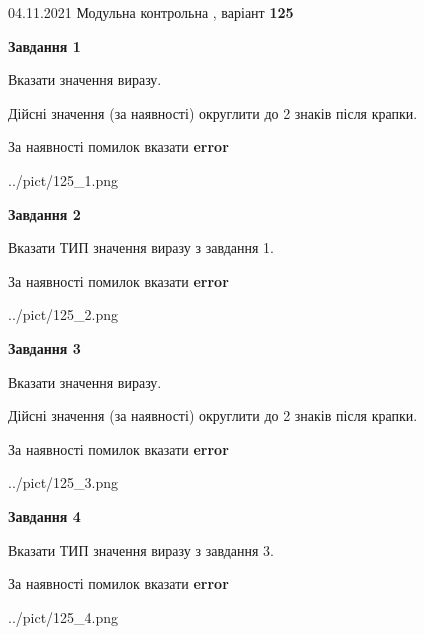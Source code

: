\documentclass[11pt, ukrainian]{article}
\begin{document}
{04.11.2021 Модульна контрольна , варіант  \No \textbf { 125 }\par}
{
\begin {large}
{\begin {center}\textbf{Завдання 1}\end {center}}\par
Вказати значення виразу. \par
Дійсні значення (за наявності) округлити до 2 знаків після крапки. \par
За наявності помилок вказати \textbf{error}

\begin{center}
	{../pict/125_1.png}
\end{center}
\newpage

{\begin {center}\textbf{Завдання 2}\end {center}}\par
Вказати ТИП значення виразу з завдання 1. \par
За наявності помилок вказати \textbf{error}

\begin{center}
	{../pict/125_2.png}
\end{center}
\newpage

{\begin {center}\textbf{Завдання 3}\end {center}}\par
Вказати значення виразу. \par
Дійсні значення (за наявності) округлити до 2 знаків після крапки. \par
За наявності помилок вказати \textbf{error}

\begin{center}
	{../pict/125_3.png}
\end{center}
\newpage

{\begin {center}\textbf{Завдання 4}\end {center}}\par
Вказати ТИП значення виразу з завдання 3. \par
За наявності помилок вказати \textbf{error}

\begin{center}
	{../pict/125_4.png}
\end{center}
\newpage


\end{large}}
\end{document}
